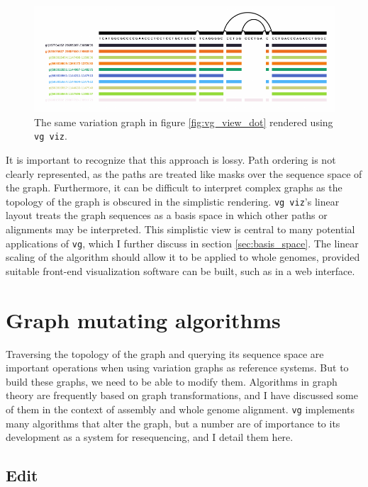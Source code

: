 \begin{figure}[htbp!] 
\centering    
\includegraphics[width=1.0\textwidth]{Chapter2/Figs/Vector/vg_viz_H-3136.pdf}
\caption[Linearized variation graph visualization]{The same variation graph in figure \ref{fig:vg_view_dot} rendered using {\tt vg viz}.}
\label{fig:vg_viz}
\end{figure}

It is important to recognize that this approach is lossy.
Path ordering is not clearly represented, as the paths are treated like masks over the sequence space of the graph.
Furthermore, it can be difficult to interpret complex graphs as the topology of the graph is obscured in the simplistic rendering.
{\tt vg viz}'s linear layout treats the graph sequences as a basis space in which other paths or alignments may be interpreted.
This simplistic view is central to many potential applications of {\tt vg}, which I further discuss in section \ref{sec:basis_space}.
The linear scaling of the algorithm should allow it to be applied to whole genomes, provided suitable front-end visualization software can be built, such as in a web interface.

\section{Graph mutating algorithms}

Traversing the topology of the graph and querying its sequence space are important operations when using variation graphs as reference systems.
But to build these graphs, we need to be able to modify them.
Algorithms in graph theory are frequently based on graph transformations, and I have discussed some of them in the context of assembly and whole genome alignment.
{\tt vg} implements many algorithms that alter the graph, but a number are of importance to its development as a system for resequencing, and I detail them here.

\subsection{Edit}

